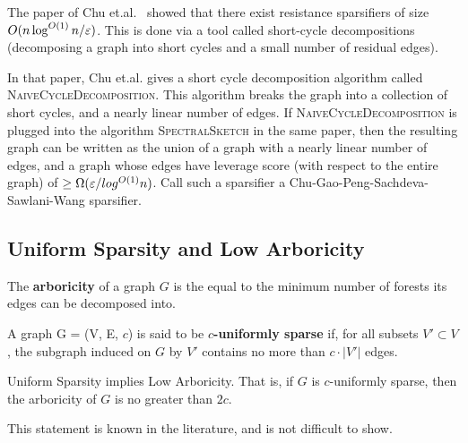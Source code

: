   The paper of Chu et.al.~\cite{ChuGPSSW18} showed that there exist
  resistance sparsifiers of size $O(n \log^{O(1)} n / \varepsilon)$. This is
  done via a tool called short-cycle decompositions (decomposing a graph
  into short cycles and a small number of residual edges).

  In that paper, Chu et.al. gives a short cycle decomposition algorithm called
  \textsc{NaiveCycleDecomposition}. This algorithm breaks the graph into a
  collection of short cycles, and a nearly linear number of edges.
  If \textsc{NaiveCycleDecomposition} is plugged into the algorithm
  \textsc{SpectralSketch} in the same paper, then the resulting graph
  can be written as the union of a graph with a nearly linear number of edges,
  and a graph whose edges have leverage score (with respect to the entire
  graph) of $ \geq \Omega(\varepsilon / log^{O(1)} n)$. Call such a sparsifier
  a Chu-Gao-Peng-Sachdeva-Sawlani-Wang sparsifier.

\subsection{Uniform Sparsity and Low Arboricity}

\begin{definition}
The \textbf{arboricity} of a graph $G$ is the equal to the minimum number of forests its edges can be decomposed into.
\end{definition}
\begin{definition}
A graph G = (V, E, $c$) is said to be \textbf{$c$-uniformly sparse} if, for all subsets $V' \subset V$, the subgraph induced on $G$ by $V'$ contains no more than $c \cdot |V'|$ edges.
\end{definition}

\begin{lemma} \label{lem:lowarb}
Uniform Sparsity implies Low Arboricity. That is, if $G$ is $c$-uniformly sparse, then the arboricity of $G$ is no greater than $2c$.
\end{lemma}
This statement is known in the literature, and is not difficult to show.

